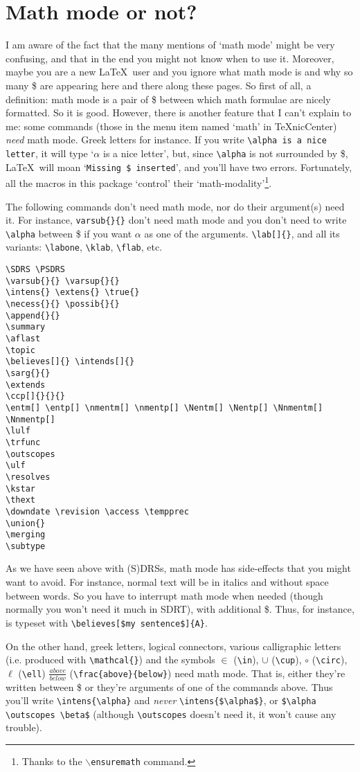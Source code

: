 \documentclass[a4paper]{article}
\begin{document}
\section{Math mode or not?} 

I am aware of the fact that the many mentions of `math mode' might be very confusing, and that in the end you might not know when to use it. Moreover, maybe you are a new \LaTeX\ user and you ignore what math mode is and why so many \$ are appearing here and there along these pages. So first of all, a definition: math mode is a pair of \$ between which math formulae are nicely formatted. So it is good. However, there is another feature that I can't explain to me: some commands (those in the menu item named `math' in TeXnicCenter) \emph{need} math mode. Greek letters for instance. If you write \verb+\alpha is a nice letter+, it will type `$\alpha$ is a nice letter', but, since \verb+\alpha+ is not surrounded by \$, \LaTeX\ will moan `\verb+Missing $ inserted+', and you'll have two errors. Fortunately, all the macros in this package `control' their `math-modality'\footnote{Thanks to the \texttt{$\backslash$ensuremath} command.}.

The following commands don't need math mode, nor do their argument(s) need it. For instance, \verb+varsub{}{}+ don't need math mode and you don't need to write \verb+\alpha+ between \$ if you want $\alpha$ as one of the arguments. 
\newline
\newline
\noindent\verb+\lab[]{}+, and all its variants: \verb+\labone+, \verb+\klab+, \verb+\flab+, etc.
\begin{verbatim}
\SDRS \PSDRS
\varsub{}{} \varsup{}{}
\intens{} \extens{} \true{}
\necess{}{} \possib{}{}
\append{}{}
\summary
\aflast
\topic
\believes[]{} \intends[]{}
\sarg{}{}
\extends
\ccp[]{}{}{}
\entm[] \entp[] \nmentm[] \nmentp[] \Nentm[] \Nentp[] \Nnmentm[] \Nnmentp[]
\lulf
\trfunc
\outscopes
\ulf
\resolves
\kstar
\thext
\downdate \revision \access \tempprec
\union{}
\merging
\subtype
\end{verbatim}
As we have seen above with (S)DRSs, math mode has side-effects that you might want to avoid. For instance, normal text will be in italics and without space between words. So you have to interrupt math mode when needed (though normally you won't need it much in SDRT), with additional \$. Thus, for instance,  is typeset with \verb+\believes[$my sentence$]{A}+. 

On the other hand, greek letters, logical connectors, various calligraphic letters (i.e. produced with \verb+\mathcal{}+) and the symbols $\in$ (\verb+\in+), $\cup$ (\verb+\cup+), $\circ$ (\verb+\circ+), $\ell$ (\verb+\ell+) $\frac{above}{below}$ (\verb+\frac{above}{below}+) need math mode. That is, either they're written between \$ or they're arguments of one of the commands above. Thus you'll write \verb+\intens{\alpha}+ and \emph{never} \verb+\intens{$\alpha$}+, or \verb+$\alpha \outscopes \beta$+ (although \verb+\outscopes+ doesn't need it, it won't cause any trouble).
\end{document}
